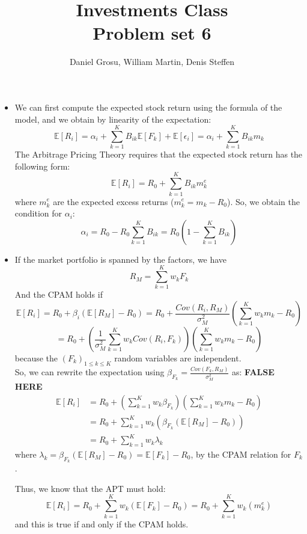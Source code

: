 \documentclass[10pt]{article}
\newcommand{\Ebb}{\mathbb{E}}
\newenvironment{exercise}[2][Exercise]{\begin{trivlist}
  \item[\hskip \labelsep {\bfseries #1}\hskip \labelsep {\bfseries #2.}]}{\end{trivlist}}
\begin{document}
	
  \renewcommand{\qedsymbol}{\smiley}
	\title{Investments Class \\ Problem set 6}
	\author{Daniel Grosu, William Martin, Denis Steffen}
		
\maketitle

\begin{exercise}{1}
  \begin{itemize}
    \item We can first compute the expected stock return using the formula of the model, and we obtain by linearity of the expectation: 
     $$ \Ebb[R_i] = \alpha_i + \sum_{k=1}^K B_{ik}\Ebb[F_k] + \Ebb[\epsilon_i] = \alpha_i + \sum_{k=1}^K B_{ik}m_k $$
     The Arbitrage Pricing Theory requires that the expected stock return has the following form: $$ \Ebb[R_i] = R_0 + \sum_{k=1}^K B_{ik}m_k^e$$ where $m_k^e$ are the expected excess returns ($m_k^e = m_k - R_0$). 
     So, we obtain the condition for $\alpha_i$: 
     $$ \alpha_i = R_0 - R_0\sum_{k=1}^K B_{ik} = R_0(1-\sum_{k=1}^KB_{ik})$$
    \item If the market portfolio is spanned by the factors, we have $$ R_M = \sum_{k=1}^Kw_kF_k$$ And the CPAM holds if $$ \Ebb[R_i] = R_0 + \beta_i(\Ebb[R_M]-R_0) = R_0 + \frac{Cov(R_i,R_M)}{\sigma_M^2}(\sum_{k=1}^Kw_km_k-R_0)$$
    $$ = R_0 + \left(\frac{1}{\sigma_M^2}\sum_{k=1}^Kw_kCov(R_i,F_k)\right)(\sum_{k=1}^Kw_km_k-R_0)$$ because the $(F_k)_{1\leq k\leq K}$ random variables are independent.
    \\
    So, we can rewrite the expectation using $\beta_{F_k} = \frac{Cov(F_k,R_M)}{\sigma_M^2}$ as: \textbf{FALSE HERE}
    \begin{align*}
      \Ebb[R_i] &= R_0 + \left(\sum_{k=1}^K w_k\beta_{F_k}\right)\left(\sum_{k=1}^Kw_km_k-R_0\right) \\
      &= R_0 + \sum_{k=1}^K w_k(\beta_{F_k}(\Ebb[R_M]-R_0)) \\
      &= R_0 + \sum_{k=1}^K w_k\lambda_k
    \end{align*} where $ \lambda_k = \beta_{F_k}(\Ebb[R_M]-R_0) = \Ebb[F_k] - R_0$, by the CPAM relation for $F_k$.

    Thus, we know that the APT must hold: 
    $$ \Ebb[R_i] = R_0 + \sum_{k=1}^K w_k(\Ebb[F_k] - R_0) = R_0 + \sum_{k=1}^K w_k(m_k^e)$$ and this is true if and only if the CPAM holds. 

  \end{itemize}
	
\end{exercise}
  
\end{document}
